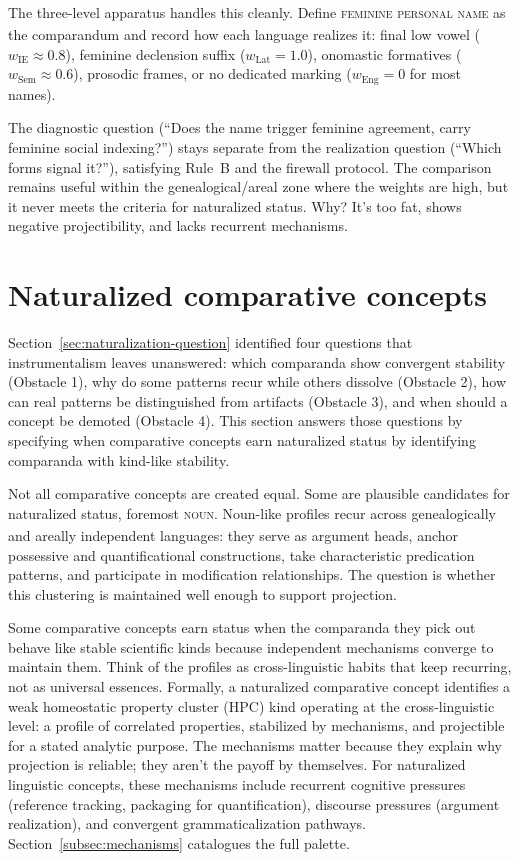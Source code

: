 \documentclass[12pt]{article}
\begin{document}
The three-level apparatus handles this cleanly. Define \textsc{feminine personal name}\textsubscript{\Cross} as the comparandum and record how each language realizes it: final low vowel ($w_{\mathrm{IE}} \approx 0.8$), feminine declension suffix ($w_{\mathrm{Lat}} = 1.0$), onomastic formatives ($w_{\mathrm{Sem}} \approx 0.6$), prosodic frames, or no dedicated marking ($w_{\mathrm{Eng}} = 0$ for most names).

The diagnostic question (\enquote{Does the name trigger feminine agreement, carry feminine social indexing?}) stays separate from the realization question (\enquote{Which forms signal it?}), satisfying Rule~B and the firewall protocol. The comparison remains useful within the genealogical/areal zone where the weights are high, but it never meets the criteria for naturalized status. Why? It's too fat, shows negative projectibility, and lacks recurrent mechanisms.

\section{Naturalized comparative concepts}\label{sec:naturalized}

Section~\ref{sec:naturalization-question} identified four questions that instrumentalism leaves unanswered: which comparanda show convergent stability (Obstacle 1), why do some patterns recur while others dissolve (Obstacle 2), how can real patterns be distinguished from artifacts (Obstacle 3), and when should a concept be demoted (Obstacle 4). This section answers those questions by specifying when comparative concepts earn naturalized status by identifying comparanda with kind-like stability.

Not all comparative concepts are created equal. Some are plausible candidates for naturalized status, foremost \textsc{noun}\textsubscript{\Cross}. Noun-like profiles recur across genealogically and areally independent languages: they serve as argument heads, anchor possessive and quantificational constructions, take characteristic predication patterns, and participate in modification relationships. The question is whether this clustering is maintained well enough to support projection.

Some comparative concepts earn  status when the comparanda they pick out behave like stable scientific kinds because independent mechanisms converge to maintain them. Think of the profiles as cross-linguistic habits that keep recurring, not as universal essences. Formally, a naturalized comparative concept identifies a weak homeostatic property cluster (HPC) kind operating at the cross-linguistic level: a profile of correlated properties, stabilized by mechanisms, and projectible for a stated analytic purpose. The mechanisms matter because they explain why projection is reliable; they aren't the payoff by themselves. For naturalized linguistic concepts, these mechanisms include recurrent cognitive pressures (reference tracking, packaging for quantification), discourse pressures (argument realization), and convergent grammaticalization pathways. Section~\ref{subsec:mechanisms} catalogues the full palette.
\end{document}
